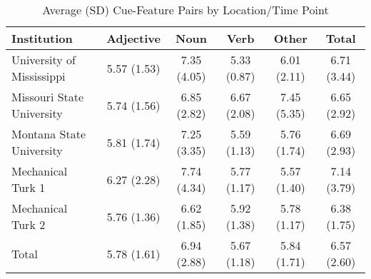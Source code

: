 \documentclass[english,,man]{apa6}
\begin{document}
\begin{table}[tbp]
\begin{center}
\begin{threeparttable}
\caption{\label{tab:feature-table}Average (SD) Cue-Feature Pairs by Location/Time Point}
\begin{tabular}{lccccc}
\toprule
Institution & Adjective & Noun & Verb & Other & Total\\
\midrule
University of Mississippi & 5.57 (1.53) & 7.35 (4.05) & 5.33 (0.87) & 6.01 (2.11) & 6.71 (3.44)\\
Missouri State University & 5.74 (1.56) & 6.85 (2.82) & 6.67 (2.08) & 7.45 (5.35) & 6.65 (2.92)\\
Montana State University & 5.81 (1.74) & 7.25 (3.35) & 5.59 (1.13) & 5.76 (1.74) & 6.69 (2.93)\\
Mechanical Turk 1 & 6.27 (2.28) & 7.74 (4.34) & 5.77 (1.17) & 5.57 (1.40) & 7.14 (3.79)\\
Mechanical Turk 2 & 5.76 (1.36) & 6.62 (1.85) & 5.92 (1.38) & 5.78 (1.17) & 6.38 (1.75)\\
Total & 5.78 (1.61) & 6.94 (2.88) & 5.67 (1.18) & 5.84 (1.71) & 6.57 (2.60)\\
\bottomrule
\end{tabular}
\end{threeparttable}
\end{center}
\end{table}
\end{document}
